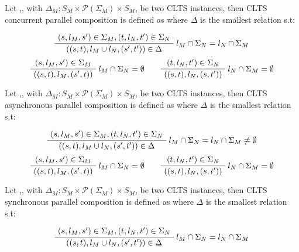 \documentclass{article}
\begin{document}
\begin{definition} 
	Let ,, with $\Delta_M : S_M \times \mathcal{P}(\Sigma_M) \times S_M$, be two CLTS instances, then CLTS concurrent parallel composition is defined as  where $\Delta$ is the smallest relation s.t:
	\begin{center}
		\begin{equation}
		\AxiomC{$(s, l_M, s') \in \Sigma_M,(t, l_N, t') \in \Sigma_N  $}\RightLabel{$l_M \cap \Sigma_N = l_N \cap \Sigma_M$}
		\UnaryInfC{$((s,t),l_M \cup l_N,(s',t')) \in \Delta$}
		\DisplayProof
		\end{equation}	
		\begin{equation}
		\AxiomC{$(s, l_M, s') \in \Sigma_M $}\RightLabel{$l_M \cap \Sigma_N = \emptyset$}
		\UnaryInfC{$((s,t),l_M,(s',t))$}
		\DisplayProof
		\quad\quad
		\AxiomC{$(t, l_N, t') \in \Sigma_N $}\RightLabel{$l_N \cap \Sigma_M = \emptyset$}
		\UnaryInfC{$((s,t),l_N,(s,t'))$}
		\DisplayProof
		\end{equation}
	\end{center}
\end{definition}

\begin{definition} 
	Let ,, with $\Delta_M : S_M \times \mathcal{P}(\Sigma_M) \times S_M$, be two CLTS instances, then CLTS asynchronous parallel composition is defined as  where $\Delta$ is the smallest relation s.t:
	\begin{center}
		\begin{equation}
		\AxiomC{$(s, l_M, s') \in \Sigma_M,(t, l_N, t') \in \Sigma_N  $}\RightLabel{$l_M \cap \Sigma_N = l_N \cap \Sigma_M \neq \emptyset$}
		\UnaryInfC{$((s,t),l_M \cup l_N,(s',t')) \in \Delta$}
		\DisplayProof
		\end{equation}	
		\begin{equation}
		\AxiomC{$(s, l_M, s') \in \Sigma_M $}\RightLabel{$l_M \cap \Sigma_N = \emptyset$}
		\UnaryInfC{$((s,t),l_M,(s',t))$}
		\DisplayProof
		\quad\quad
		\AxiomC{$(t, l_N, t') \in \Sigma_N $}\RightLabel{$l_N \cap \Sigma_M = \emptyset$}
		\UnaryInfC{$((s,t),l_N,(s,t'))$}
		\DisplayProof
		\end{equation}
	\end{center}
\end{definition}

\begin{definition} 
	Let ,, with $\Delta_M : S_M \times \mathcal{P}(\Sigma_M) \times S_M$, be two CLTS instances, then CLTS synchronous parallel composition is defined as  where $\Delta$ is the smallest relation s.t:
	\begin{center}
		\begin{equation}
		\AxiomC{$(s, l_M, s') \in \Sigma_M,(t, l_N, t') \in \Sigma_N  $}\RightLabel{$l_M \cap \Sigma_N = l_N \cap \Sigma_M$}
		\UnaryInfC{$((s,t),l_M \cup l_N,(s',t')) \in \Delta$}
		\DisplayProof
		\end{equation}	
	\end{center}
\end{definition}
\end{document}
